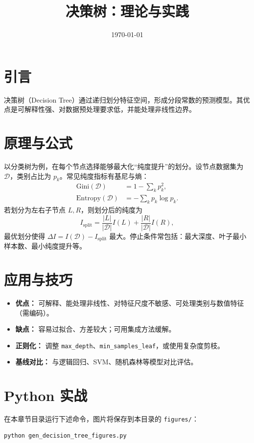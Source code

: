 \documentclass[UTF8,zihao=-4]{ctexart}
\title{决策树：理论与实践}
\author{}
\date{\today}
\begin{document}
\maketitle


\section{引言}
决策树（Decision Tree）通过递归划分特征空间，形成分段常数的预测模型。其优点是可解释性强、对数据预处理要求低，并能处理非线性边界。

\section{原理与公式}
以分类树为例，在每个节点选择能够最大化“纯度提升”的划分。设节点数据集为 $\mathcal{D}$，类别占比为 $p_k$。常见纯度指标有基尼与熵：
\begin{align}
\mathrm{Gini}(\mathcal{D}) &= 1 - \sum_k p_k^2,\\
\mathrm{Entropy}(\mathcal{D}) &= -\sum_k p_k \log p_k.
\end{align}
若划分为左右子节点 $L,R$，则划分后的纯度为
\begin{equation}
I_{\mathrm{split}} = \frac{|L|}{|\mathcal{D}|} I(L) + \frac{|R|}{|\mathcal{D}|} I(R),
\end{equation}
最优划分使得 $\Delta I = I(\mathcal{D}) - I_{\mathrm{split}}$ 最大。停止条件常包括：最大深度、叶子最小样本数、最小纯度提升等。

\section{应用与技巧}
\begin{itemize}
  \item \textbf{优点：} 可解释、能处理非线性、对特征尺度不敏感、可处理类别与数值特征（需编码）。
  \item \textbf{缺点：} 容易过拟合、方差较大；可用集成方法缓解。
  \item \textbf{正则化：} 调整 \texttt{max\_depth}、\texttt{min\_samples\_leaf}，或使用复杂度剪枝。
  \item \textbf{基线对比：} 与逻辑回归、SVM、随机森林等模型对比评估。
\end{itemize}

\section{Python 实战}
在本章节目录运行下述命令，图片将保存到本目录的 \texttt{figures/}：
\begin{lstlisting}[style=code,caption={生成决策树配图},label={lst:genfigs_dt_cn}]
python gen_decision_tree_figures.py
\end{lstlisting}
\end{document}
